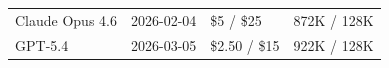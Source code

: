 \begin{table}[b!]
{\begin{tabular}{@{}p{2.2cm}p{1.6cm}p{2.0cm}p{1.5cm}@{}}
Claude Opus 4.6         & 2026-02-04 & \$5 / \$25      & 872K / 128K \\
GPT-5.4                 & 2026-03-05 & \$2.50 / \$15   & 922K / 128K \\
\bottomrule
\end{tabular}%
}
\end{table}

%
%
%

